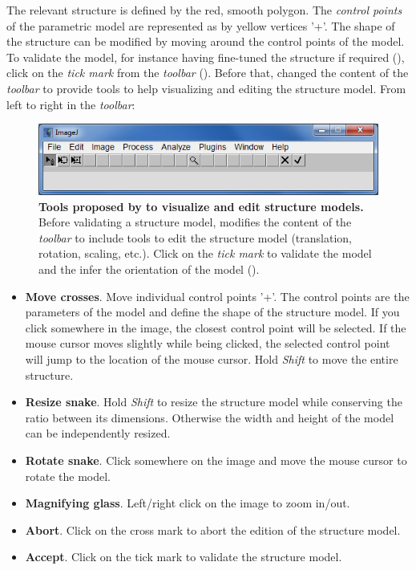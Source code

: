 The relevant structure is defined by the red, smooth polygon. The \emph{control points} of the parametric model are represented as by yellow vertices '+'. The shape of the structure can be modified by moving around the control points of the model. To validate the model, for instance having fine-tuned the structure if required (), click on the \textit{tick mark} from the \textit{\ij toolbar} (). Before that, \wingj changed the content of the \textit{\ij toolbar} to provide tools to help visualizing and editing the structure model. From left to right in the \textit{\ij toolbar}:

\begin{figure}[!h]
\centering
\includegraphics[scale=0.6]{images/ij_toolbar.jpg}
\caption{\textbf{Tools proposed by \wingj to visualize and edit structure models.} Before validating a structure model, \wingj modifies the content of the \textit{\ij toolbar} to include tools to edit the structure model (translation, rotation, scaling, etc.). Click on the \textit{tick mark} to validate the model and the infer the orientation of the model ().}
\label{fig:ij_toolbar}
\end{figure}

\begin{itemize}
 \item \textbf{Move crosses}. Move individual control points '+'. The control points are the parameters of the model and define the shape of the structure model. If you click somewhere in the image, the closest control point will be selected. If the mouse cursor moves slightly while being clicked, the selected control point will jump to the location of the mouse cursor. Hold \textit{Shift} to move the entire structure.
 \item \textbf{Resize snake}. Hold \textit{Shift} to resize the structure model while conserving the ratio between its dimensions. Otherwise the width and height of the model can be independently resized.
 \item \textbf{Rotate snake}. Click somewhere on the image and move the mouse cursor to rotate the model.
 \item \textbf{Magnifying glass}. Left/right click on the image to zoom in/out.
 \item \textbf{Abort}. Click on the cross mark to abort the edition of the structure model.
 \item \textbf{Accept}. Click on the tick mark to validate the structure model.
\end{itemize}


